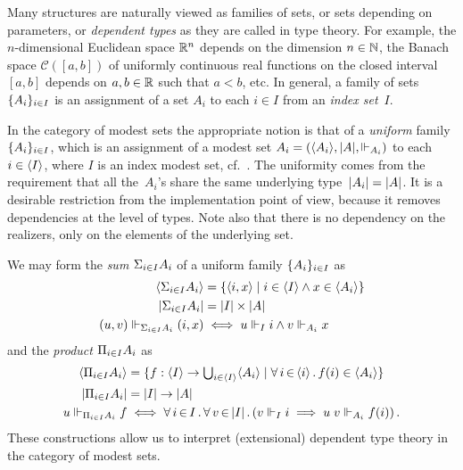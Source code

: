 Many structures are naturally viewed as families of sets, or sets
depending on parameters, or \emph{dependent types} as they are called
in type theory. For example, the $n$-dimensional Euclidean space
$\mathbb{R}^n$ depends on the dimension $n \in \mathbb{N}$, the Banach space
$\mathcal{C}([a,b])$ of uniformly continuous real functions on the
closed interval $[a,b]$ depends on $a, b \in \mathbb{R}$ such that $a < b$,
etc. In general, a family of sets $\{A_i\}_{i \in I}$ is an
assignment of a set $A_i$ to each $i \in I$ from an \emph{index
  set}~$I$.

In the category of modest sets the appropriate notion is that of a
\emph{uniform} family~$\{A_i\}_{i \in I}$, which is an assignment
of a modest set $A_i = (\langle A_i \rangle, |A|, {\Vdash_{A_i}})$ to each
$i \in \langle I \rangle$, where $I$ is an index modest set,
cf.~\cite{Jacobs,Birkedal}. The uniformity comes from the requirement
that all the~$A_i$'s share the same underlying type~$|A_i| =
|A|$. It is a desirable restriction from the implementation
point of view, because it removes dependencies at the level of types.
Note also that there is no dependency on the realizers, only on the
elements of the underlying set.

We may form the \emph{sum} ${\Sigma_{i \in I} A_i}$ of a uniform family
$\{A_i\}_{i \in I}$ as
%
\begin{align*}
  \langle {\Sigma_{i \in I} A_i} \rangle &=
  \{\langle i,x \rangle \mid i \in \langle I \rangle \land x \in \langle A_i \rangle\}
  \\
  |{\Sigma_{i \in I} A_i}| &=
  |I| \times |A|
  \\
  (u,v) \Vdash_{{\Sigma_{i \in I} A_i}} (i,x)
  &\iff
  u \Vdash_I i \land v \Vdash_{A_i} x
\end{align*}
%
and the \emph{product} ${\Pi_{i \in I} A_i}$ as
%
\begin{align*}
  \langle {\Pi_{i \in I} A_i} \rangle &=
  \{f : \langle I \rangle \to {\textstyle \bigcup_{i \in \langle I \rangle} \langle A_i \rangle} \mid
    \forall\, i \,{\in}\, \langle i \rangle\,.\,f(i) \in \langle A_i \rangle\}
  \\
  |{\Pi_{i \in I} A_i}| &=
  |I| \to |A|
  \\
  u \Vdash_{{\Pi_{i \in I} A_i}} f
  &\iff
  \forall\, i \,{\in}\, I\,.\,\forall\, v \,{\in}\, |I|\,.\left(
      v \Vdash_I i \implies
      u \; v \Vdash_{A_i} f(i)
    \right).
\end{align*}
%
These constructions allow us to interpret (extensional) dependent type
theory in the category of modest sets.

